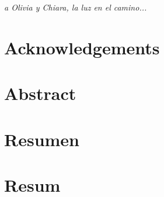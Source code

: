 

\cleartorecto



\cleartorecto



\cleartorecto
\thispagestyle{empty}
\vspace*{3cm}
\begin{flushright}
\textit{a Olivia y Chiara, la luz en el camino...}
\end{flushright}


\cleartorecto
\chapter*{Acknowledgements}



\cleartorecto
\chapter{Abstract}



\cleartorecto
{}
\chapter*{Resumen}



\cleartorecto
{}
\chapter*{Resum}



%

